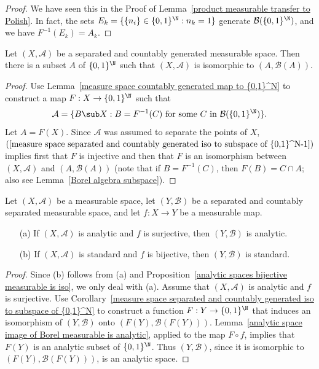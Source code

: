 \begin{proof}
We have seen this in the Proof of Lemma~\ref{product measurable transfer to Polish}. In fact, the sets $E_k=\{\{n_i\}\in\{0,1\}^\N:n_k=1\}$ generate $\mathcal{B}(\{0,1\}^\N)$, and we have $F^{-1}(E_k)=A_k$.
\end{proof}
\begin{corollary}\label{measure space separated and countably generated iso to subspace of {0,1}^N}
Let $(X,\mathcal{A})$ be a separated and countably generated measurable space. Then there is a subset $A$ of $\{0,1\}^\N$ such that $(X,\mathcal{A})$ is isomorphic to $(A,\mathcal{B}(A))$.
\end{corollary}
\begin{proof}
Use Lemma~\ref{measure space countably generated map to {0,1}^N} to construct a map $F:X\to\{0,1\}^\N$ such that
\begin{align}\label{measure space separated and countably generated iso to subspace of {0,1}^N-1}
\mathcal{A}=\{B\sub X:B=F^{-1}(C)\text{ for some $C$ in $\mathcal{B}(\{0,1\}^\N)$}\}.
\end{align}
Let $A=F(X)$. Since $\mathcal{A}$ was assumed to separate the points of $X$, $(\ref{measure space separated and countably generated iso to subspace of {0,1}^N-1})$ implies first that $F$ is injective and then that $F$ is an isomorphism between $(X,\mathcal{A})$ and $(A,\mathcal{B}(A))$ (note that if $B=F^{-1}(C)$, then $F(B)=C\cap A$; also see Lemma~\ref{Borel algebra subspace}).
\end{proof}
\begin{proposition}\label{measure space separated and countably generated}
Let $(X,\mathcal{A})$ be a measurable space, let $(Y,\mathcal{B})$ be a separated and countably separated measurable space, and let $f:X\to Y$ be a measurable map.
\begin{itemize}
\item[(a)] If $(X,\mathcal{A})$ is analytic and $f$ is surjective, then $(Y,\mathcal{B})$ is analytic.
\item[(b)] If $(X,\mathcal{A})$ is standard and $f$ is bijective, then $(Y,\mathcal{B})$ is standard.
\end{itemize}
\end{proposition}
\begin{proof}
Since (b) follows from (a) and Proposition~\ref{analytic spaces bijective measurable is iso}, we only deal with (a). Assume that $(X,\mathcal{A})$ is analytic and $f$ is surjective. Use Corollary~\ref{measure space separated and countably generated iso to subspace of {0,1}^N} to construct a function $F:Y\to\{0,1\}^\N$ that induces an isomorphism of $(Y,\mathcal{B})$ onto $(F(Y),\mathcal{B}(F(Y)))$. Lemma~\ref{analytic space image of Borel measurable is analytic}, applied to the map $F\circ f$, implies that $F(Y)$ is an analytic subset of $\{0,1\}^\N$. Thus $(Y,\mathcal{B})$, since it is isomorphic to $(F(Y),\mathcal{B}(F(Y)))$, is an analytic space.
\end{proof}
